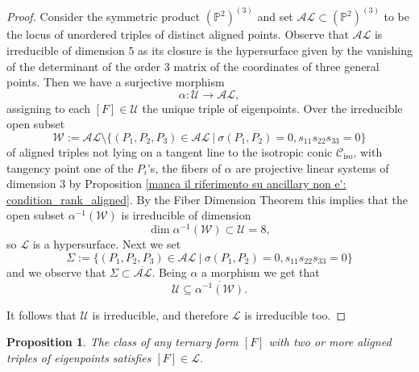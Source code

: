 \documentclass{amsart}
\theoremstyle{plain}
\newtheorem{prop}[lemma]{Proposition}
\theoremstyle{definition}
\newcommand{\p}{\mathbb{P}}
\newcommand{\sL}{\mathcal{L}}
\newcommand{\sU}{\mathcal{U}}
\newcommand{\sV}{\mathcal{V}}
\newcommand{\iso}{\mathcal{C}_{\mathrm{iso}}}
\newcommand{\iii}{\textbf{i}}
\begin{document}
{\begin{proof}
Consider the symmetric product $(\p^2) ^{(3)}$ and set $\mathcal {AL} \subset (\p^2) ^{(3)}$ to be the locus of unordered triples of distinct aligned points. Observe that $\mathcal {AL}$ is irreducible of dimension $5$ as its closure is the hypersurface given by the vanishing of the determinant of the order $3$ matrix of the coordinates of three general points. Then we have a surjective morphism
$$
\alpha : \mathcal{U} \to \mathcal {AL},
$$
assigning to each $[F] \in \mathcal{U}$ the unique triple of eigenpoints. Over the irreducible open subset
$$
\mathcal W := \mathcal {AL}
\setminus \{(P_1,P_2,P_3)\in\mathcal {AL}
\ | \ \sigma(P_1,P_2)=0, s_{11} s_{22} s_{33}=0\}
$$
of aligned triples not lying
on a tangent line to the isotropic conic $\iso$, with tangency point one of the $P_i$'s, the fibers of $\alpha$ are projective linear systems of dimension $3$ by
Proposition \ref{manca il riferimento su ancillary    non e': condition_rank_aligned}. By the Fiber Dimension Theorem this implies that the open subset $\alpha ^{-1} (\mathcal W)$ is irreducible of dimension
$$
\dim \alpha ^{-1} (\mathcal W)
\subset \sU=8 ,
$$
so $\sL$ is a hypersurface. Next we set
$$
\Sigma:=\{(P_1,P_2,P_3)\in\mathcal {AL}
\ | \ \sigma(P_1,P_2)=0, s_{11} s_{22} s_{33}=0\}
$$
and we observe that $\Sigma \subset \overline {\mathcal {AL}}$. Being $\alpha$ a morphism we get
that
$$
\sU \subseteq \overline {\alpha^{-1} (\mathcal W)}.
$$

%



It follows that $\sU$ is irreducible, and therefore $\sL$ is irreducible too.
\end{proof}

\begin{prop}
The class of any ternary form $[F]$ with two or more aligned triples of eigenpoints satisfies
$
[F] \in \sL.
$


\end{prop}}
\end{document}
